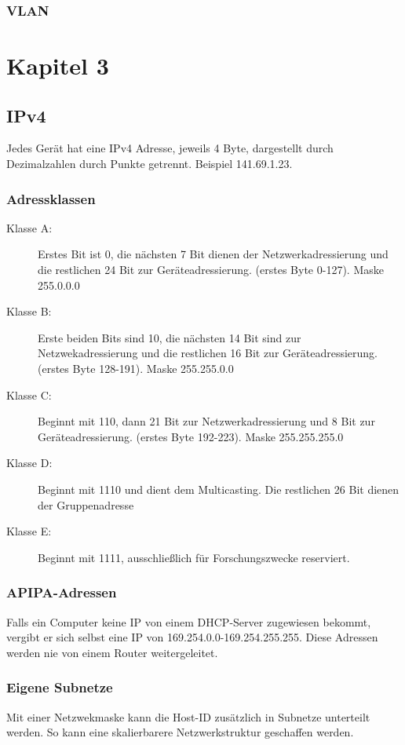 \documentclass[a4paper,10pt]{scrartcl}
\begin{document}
        \subsubsection{VLAN}
            
        \newpage
\section{Kapitel 3}
    \subsection{IPv4}
    Jedes Gerät hat eine IPv4 Adresse, jeweils 4 Byte, dargestellt durch Dezimalzahlen durch Punkte getrennt. Beispiel 141.69.1.23. 
    \subsubsection{Adressklassen}
    \begin{description}
        \item[Klasse A:] Erstes Bit ist 0, die nächsten 7 Bit dienen der Netzwerkadressierung und die restlichen 24 Bit zur Geräteadressierung. (erstes Byte 0-127). Maske 255.0.0.0
        \item[Klasse B:] Erste beiden Bits sind 10, die nächsten 14 Bit sind zur Netzwekadressierung und die restlichen 16 Bit zur Geräteadressierung. (erstes Byte 128-191). Maske 255.255.0.0
        \item[Klasse C:] Beginnt mit 110, dann 21 Bit zur Netzwerkadressierung und 8 Bit zur Geräteadressierung. (erstes Byte 192-223). Maske 255.255.255.0
        \item[Klasse D:] Beginnt mit 1110 und dient dem Multicasting. Die restlichen 26 Bit dienen der Gruppenadresse
        \item[Klasse E:] Beginnt mit 1111, ausschließlich für Forschungszwecke reserviert.
    \end{description}
    \subsubsection{APIPA-Adressen}
        Falls ein Computer keine IP von einem DHCP-Server zugewiesen bekommt, vergibt er sich selbst eine IP von 169.254.0.0-169.254.255.255. Diese Adressen werden nie von einem Router weitergeleitet.
    \subsubsection{Eigene Subnetze}
        Mit einer Netzwekmaske kann die Host-ID zusätzlich in Subnetze unterteilt werden. So kann eine skalierbarere Netzwerkstruktur geschaffen werden.
\end{document}
